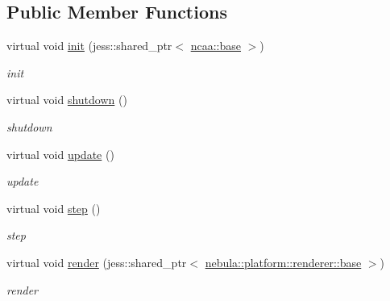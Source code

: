 \subsection*{Public Member Functions}
\begin{DoxyCompactItemize}
\item 
virtual void \hyperlink{classnebula_1_1content_1_1actor_1_1physics_1_1physx_1_1vehicle_a5a02b3b91000246214cc333335e41615}{init} (jess::shared\_\-ptr$<$ \hyperlink{classnebula_1_1content_1_1actor_1_1admin_1_1base}{ncaa::base} $>$)
\begin{DoxyCompactList}\small\item\em init \item\end{DoxyCompactList}\item 
virtual void \hyperlink{classnebula_1_1content_1_1actor_1_1physics_1_1physx_1_1vehicle_afbebdaf2bcdf945a57f77b8d8e402667}{shutdown} ()
\begin{DoxyCompactList}\small\item\em shutdown \item\end{DoxyCompactList}\item 
virtual void \hyperlink{classnebula_1_1content_1_1actor_1_1physics_1_1physx_1_1vehicle_ab9d5ea43fc0c5dbafb6bc9c014b68a56}{update} ()
\begin{DoxyCompactList}\small\item\em update \item\end{DoxyCompactList}\item 
virtual void \hyperlink{classnebula_1_1content_1_1actor_1_1physics_1_1physx_1_1vehicle_aedbb25e6286bbe59c90a6f5df29abc2b}{step} ()
\begin{DoxyCompactList}\small\item\em step \item\end{DoxyCompactList}\item 
virtual void \hyperlink{classnebula_1_1content_1_1actor_1_1physics_1_1physx_1_1vehicle_a0a381c03558fdce4620e5bd602a1c4b7}{render} (jess::shared\_\-ptr$<$ \hyperlink{classnebula_1_1platform_1_1renderer_1_1base}{nebula::platform::renderer::base} $>$)
\begin{DoxyCompactList}\small\item\em render \item\end{DoxyCompactList}\end{DoxyCompactItemize}
